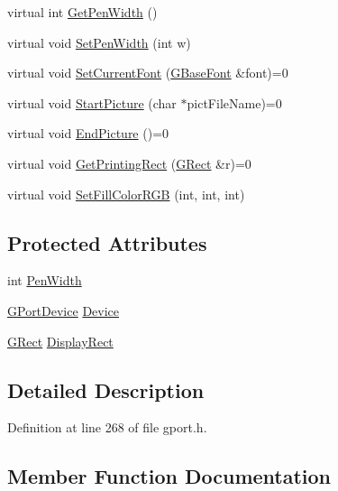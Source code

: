 \begin{DoxyCompactItemize}
\item 
virtual int \mbox{\hyperlink{class_g_base_port_aeebcbb21b90ae5614d43b0111133932e}{Get\+Pen\+Width}} ()
\item 
virtual void \mbox{\hyperlink{class_g_base_port_aa2fd1fbe050cfea5a21afb7d4cecaa61}{Set\+Pen\+Width}} (int w)
\item 
virtual void \mbox{\hyperlink{class_g_base_port_af297609a9f7ed9d29d77072037888f5e}{Set\+Current\+Font}} (\mbox{\hyperlink{class_g_base_font}{G\+Base\+Font}} \&font)=0
\item 
virtual void \mbox{\hyperlink{class_g_base_port_aad9e21ed63c4f04a508e30b7f100fba5}{Start\+Picture}} (char $\ast$pict\+File\+Name)=0
\item 
virtual void \mbox{\hyperlink{class_g_base_port_ac14e5cf72682662f8ac24c57e98b1bfa}{End\+Picture}} ()=0
\item 
virtual void \mbox{\hyperlink{class_g_base_port_af2e9e7d8adf001df68ab3e714dd4242e}{Get\+Printing\+Rect}} (\mbox{\hyperlink{class_g_rect}{G\+Rect}} \&r)=0
\item 
virtual void \mbox{\hyperlink{class_g_base_port_af13ac2220d4ff90a160294c79d4a2c1b}{Set\+Fill\+Color\+R\+GB}} (int, int, int)
\end{DoxyCompactItemize}
\subsection*{Protected Attributes}
\begin{DoxyCompactItemize}
\item 
int \mbox{\hyperlink{class_g_base_port_a9a76c3a8af8d0e9f29035d02d8f038c1}{Pen\+Width}}
\item 
\mbox{\hyperlink{gport_8h_a595e501a3b83fde14c760260fbfb153f}{G\+Port\+Device}} \mbox{\hyperlink{class_g_base_port_a14275a027c8665d5fa4941e148a1b46a}{Device}}
\item 
\mbox{\hyperlink{class_g_rect}{G\+Rect}} \mbox{\hyperlink{class_g_base_port_ac0e1180ebadeed5d3c7d0291db1bdf29}{Display\+Rect}}
\end{DoxyCompactItemize}


\subsection{Detailed Description}


Definition at line 268 of file gport.\+h.



\subsection{Member Function Documentation}
\mbox{\label{class_g_mac_port_a66b95b91c1a03a8200994ed2b7be4d67}} 
